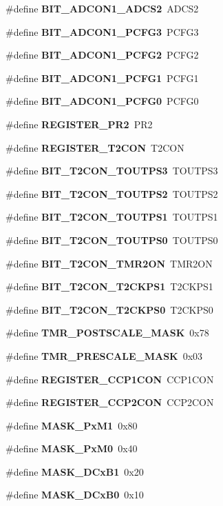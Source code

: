 \begin{DoxyCompactItemize}
\item 
\#define {\bf B\-I\-T\-\_\-\-A\-D\-C\-O\-N1\-\_\-\-A\-D\-C\-S2}~A\-D\-C\-S2
\item 
\#define {\bf B\-I\-T\-\_\-\-A\-D\-C\-O\-N1\-\_\-\-P\-C\-F\-G3}~P\-C\-F\-G3
\item 
\#define {\bf B\-I\-T\-\_\-\-A\-D\-C\-O\-N1\-\_\-\-P\-C\-F\-G2}~P\-C\-F\-G2
\item 
\#define {\bf B\-I\-T\-\_\-\-A\-D\-C\-O\-N1\-\_\-\-P\-C\-F\-G1}~P\-C\-F\-G1
\item 
\#define {\bf B\-I\-T\-\_\-\-A\-D\-C\-O\-N1\-\_\-\-P\-C\-F\-G0}~P\-C\-F\-G0
\item 
\#define {\bf R\-E\-G\-I\-S\-T\-E\-R\-\_\-\-P\-R2}~P\-R2
\item 
\#define {\bf R\-E\-G\-I\-S\-T\-E\-R\-\_\-\-T2\-C\-O\-N}~T2\-C\-O\-N
\item 
\#define {\bf B\-I\-T\-\_\-\-T2\-C\-O\-N\-\_\-\-T\-O\-U\-T\-P\-S3}~T\-O\-U\-T\-P\-S3
\item 
\#define {\bf B\-I\-T\-\_\-\-T2\-C\-O\-N\-\_\-\-T\-O\-U\-T\-P\-S2}~T\-O\-U\-T\-P\-S2
\item 
\#define {\bf B\-I\-T\-\_\-\-T2\-C\-O\-N\-\_\-\-T\-O\-U\-T\-P\-S1}~T\-O\-U\-T\-P\-S1
\item 
\#define {\bf B\-I\-T\-\_\-\-T2\-C\-O\-N\-\_\-\-T\-O\-U\-T\-P\-S0}~T\-O\-U\-T\-P\-S0
\item 
\#define {\bf B\-I\-T\-\_\-\-T2\-C\-O\-N\-\_\-\-T\-M\-R2\-O\-N}~T\-M\-R2\-O\-N
\item 
\#define {\bf B\-I\-T\-\_\-\-T2\-C\-O\-N\-\_\-\-T2\-C\-K\-P\-S1}~T2\-C\-K\-P\-S1
\item 
\#define {\bf B\-I\-T\-\_\-\-T2\-C\-O\-N\-\_\-\-T2\-C\-K\-P\-S0}~T2\-C\-K\-P\-S0
\item 
\#define {\bf T\-M\-R\-\_\-\-P\-O\-S\-T\-S\-C\-A\-L\-E\-\_\-\-M\-A\-S\-K}~0x78
\item 
\#define {\bf T\-M\-R\-\_\-\-P\-R\-E\-S\-C\-A\-L\-E\-\_\-\-M\-A\-S\-K}~0x03
\item 
\#define {\bf R\-E\-G\-I\-S\-T\-E\-R\-\_\-\-C\-C\-P1\-C\-O\-N}~C\-C\-P1\-C\-O\-N
\item 
\#define {\bf R\-E\-G\-I\-S\-T\-E\-R\-\_\-\-C\-C\-P2\-C\-O\-N}~C\-C\-P2\-C\-O\-N
\item 
\#define {\bf M\-A\-S\-K\-\_\-\-Px\-M1}~0x80
\item 
\#define {\bf M\-A\-S\-K\-\_\-\-Px\-M0}~0x40
\item 
\#define {\bf M\-A\-S\-K\-\_\-\-D\-Cx\-B1}~0x20
\item 
\#define {\bf M\-A\-S\-K\-\_\-\-D\-Cx\-B0}~0x10

\end{DoxyCompactItemize}
